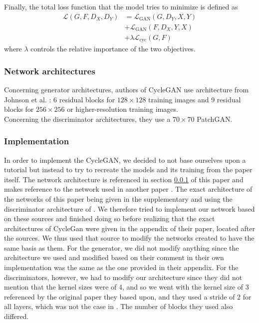 \documentclass[twocolumn,superscriptaddress,aps, floatfix]{revtex4-1}
\begin{document}
    Finally, the total loss function that the model tries to minimize is defined as
    \begin{align}
        \mathcal{L}\left(G, F, D_{X}, D_{Y}\right) &= \mathcal{L}_{\mathrm{GAN}}\left(G, D_{Y}, X, Y\right)\nonumber\\
        &+ \mathcal{L}_{\mathrm{GAN}}\left(F, D_{X}, Y, X\right)\nonumber\\
        &+ \lambda \mathcal{L}_{\mathrm{cyc}}(G, F)
    \end{align}
    where $\lambda$ controls the relative importance of the two objectives.
    
    \subsubsection{Network architectures}\label{sec:methods.cyclegan.architecture}
    
    Concerning generator architectures, authors of CycleGAN use architecture from Johnson et al. \cite{DBLP:journals/corr/JohnsonAL16} : 6 residual blocks for $128 \times 128$ training images and 9 residual blocks for $256 \times 256$ or higher-resolution training images.\\
    
    Concerning the discriminator architectures, they use a $70 \times 70$ PatchGAN.
    
    \subsubsection{Implementation}
    
    In order to implement the CycleGAN, we decided to not base ourselves upon a tutorial but instead to try to recreate the models and its training from the paper \cite{DBLP:journals/corr/ZhuPIE17} itself. The network architecture is referenced in section \ref{sec:methods.cyclegan.architecture} of this paper and makes reference to the network used in another paper \cite{DBLP:journals/corr/JohnsonAL16}. The exact architecture of the networks of this paper being given in the supplementary and using the discriminator architecture of \cite{DBLP:journals/corr/LedigTHCATTWS16}. We therefore tried to implement our network based on these sources and finished doing so before realizing that the exact architectures of CycleGan were given in the appendix of their paper, located after the sources. We thus used that source to modify the networks created to have the same basis as them. For the generator, we did not modify anything since the architecture we used and modified based on their comment in their own implementation was the same as the one provided in their appendix. For the discriminators, however, we had to modify our architecture since they did not mention that the kernel sizes were of 4, and so we went with the kernel size of 3 referenced by the original paper they based upon, and they used a stride of 2 for all layers, which was not the case in \cite{DBLP:journals/corr/LedigTHCATTWS16}. The number of blocks they used also differed.\\
    
\end{document}
